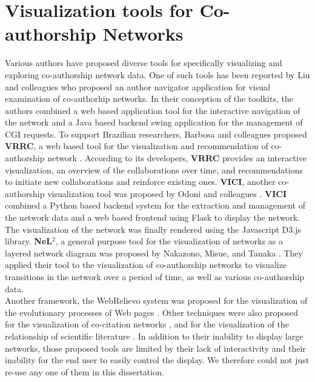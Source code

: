 \section{Visualization tools for Co-authorship Networks}
Various authors have proposed diverse tools for specifically visualizing and exploring co-authorship network data. One of such tools has been reported by Liu and colleagues \cite{liu_toolkits_2004} who proposed an author navigator application for visual examination of co-authorhip networks. In their conception of the toolkits, the authors combined a web based application tool for the interactive navigation of the network and a Java based backend swing application for the management of CGI requests. To support Brazilian researchers, Barbosa and colleagues proposed \textbf{VRRC}, a web based tool for the visualization and recommendation of co-authorship network \cite{barbosa_vrrc:_2012}. According to its developers, \textbf{VRRC} provides an interactive visualization, an overview of the collaborations over time, and recommendations to initiate new collaborations and reinforce existing ones. \textbf{VICI}, another co-authorship visualization tool was proposed by  Odoni and colleagues \cite{odoni_visualisation_2017}. \textbf{VICI} combined a Python based backend system for the extraction and management of the network data and a web based frontend using Flask \cite{grinberg_flask_2014} to display the network. The visualization of the network was finally rendered using the Javascript D3.js \cite{bostock_d3._2012} library. \textbf{NeL$^2$}, a general purpose tool for the visualization of networks as a layered network diagram was proposed by Nakazono, Misue, and Tanaka \cite{nakazono_nel_2006}. They applied their tool to the visualization of co-authorship networks to visualize transitions in the network over a period of time, as well as various co-authorship data. \\
Another framework, the WebRelievo system was proposed for the visualization of the evolutionary processes of Web pages \cite{toyoda_system_2005}. Other techniques were also proposed for the visualization of co-citation networks \cite{chen_visualizing_1999}, and for the visualization of the relationship of scientific literature \cite{erten_simultaneous_2005}. In addition to their inability to display large networks, those proposed tools are limited by their lack of interactivity and their inability for the end user to easily control the display. We therefore could not just re-use any one of them in this dissertation.

